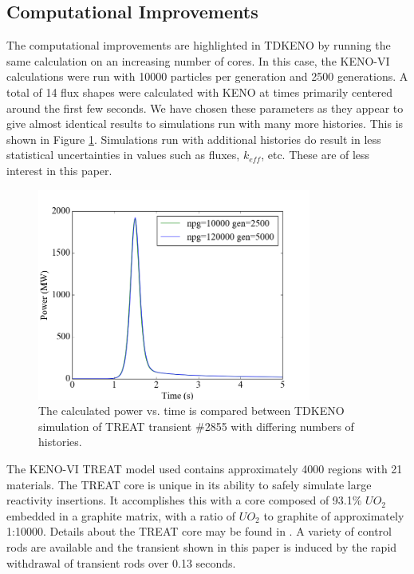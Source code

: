 \documentclass{anstrans}
\begin{document}
\subsection{Computational Improvements}

The computational improvements are highlighted in TDKENO by running the same calculation on an increasing number of cores.  In this case, the KENO-VI calculations were run with 10000 particles per generation and 2500 generations. A total of 14 flux shapes were calculated with KENO at times primarily centered around the first few seconds.  We have chosen these parameters as they appear to give almost identical results to simulations run with many more histories.  This is shown in Figure \ref{fig:compare_hist}.  Simulations run with additional histories do result in less statistical uncertainties in values such as fluxes, $k_{eff}$, etc.  These are of less interest in this paper.  

\begin{figure}[h]
    \centering
    \includegraphics[width=9cm]{figures/comp_npg2855.png}
    \caption{The calculated power vs. time is compared between TDKENO simulation of TREAT transient \#2855 with differing numbers of histories. }
        \label{fig:compare_hist}
\end{figure}

The KENO-VI TREAT model used contains approximately 4000 regions with 21 materials.  The TREAT core is unique in its ability to safely simulate large reactivity insertions.  It accomplishes this with a core composed of 93.1\% $UO_2$ embedded in a graphite matrix, with a ratio of $UO_2$ to graphite of approximately 1:10000.  Details about the TREAT core may be found in \cite{bess2015baseline}.  A variety of control rods are available and the transient shown in this paper is induced by the rapid withdrawal of transient rods over 0.13 seconds. 
\end{document}
